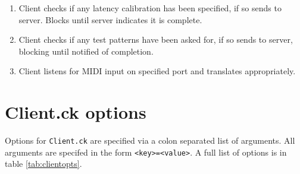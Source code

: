 \documentclass[11pt]{article}
\begin{document}
\begin{flushleft}
\begin{enumerate}[\bf1.]
\begin{enumerate} [\bf a.]
			to the console.
		\item Client checks if any latency calibration has been specified, if so sends to server. Blocks until server indicates it is complete.
		\item Client checks if any test patterns have been asked for, if so sends to server, blocking until notified of completion.
		\item Client listens for MIDI input on specified port and translates appropriately.
	 \end{enumerate}
\end{enumerate}
\end{flushleft}

\newpage
\section{Client.ck options}
\label{sec:clientopts}
Options for \texttt{Client.ck} are specified via a colon separated list of arguments. All arguments are specifed in the form \texttt{<key>=<value>}. A full list of options
is in table \ref{tab:clientopts}.
\end{document}
